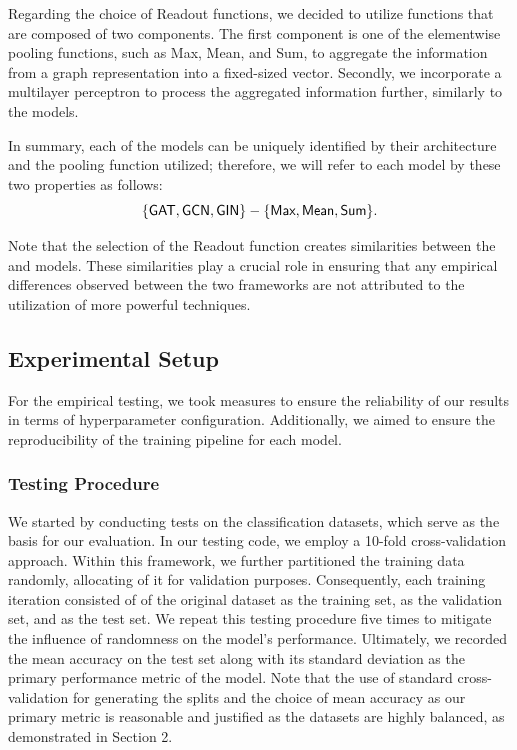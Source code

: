 Regarding the choice of \textsf{Readout} functions, we decided to utilize functions that are composed of two components. The first component is one of the elementwise pooling functions, such as \textsf{Max}, \textsf{Mean}, and \textsf{Sum}, to aggregate the information from a graph representation into a fixed-sized vector. Secondly, we incorporate a multilayer perceptron to process the aggregated information further, similarly to the \wlnn models.

In summary, each of the \gnn models can be uniquely identified by their \gnn architecture and the pooling function utilized; therefore, we will refer to each model by these two properties as follows:
\begin{equation*}
	{\{\gat, \gcn, \gin\}} - \{\textsf{Max}, \textsf{Mean}, \textsf{Sum}\}.
\end{equation*}

Note that the selection of the Readout function creates similarities between the \gnn and \wlnn models. These similarities play a crucial role in ensuring that any empirical differences observed between the two frameworks are not attributed to the utilization of more powerful techniques.

\subsection{Experimental Setup}

For the empirical testing, we took measures to ensure the reliability of our results in terms of hyperparameter configuration. Additionally, we aimed to ensure the reproducibility of the training pipeline for each model.

\subsubsection{Testing Procedure}

We started by conducting tests on the classification datasets, which serve as the basis for our evaluation. In our testing code, we employ a 10-fold cross-validation approach. Within this framework, we further partitioned the training data randomly, allocating  of it for validation purposes. Consequently, each training iteration consisted of  of the original dataset as the training set,  as the validation set, and  as the test set. We repeat this testing procedure five times to mitigate the influence of randomness on the model's performance. Ultimately, we recorded the mean accuracy on the test set along with its standard deviation as the primary performance metric of the model. Note that the use of standard cross-validation for generating the splits and the choice of mean accuracy as our primary metric is reasonable and justified as the datasets are highly balanced, as demonstrated in Section 2.

